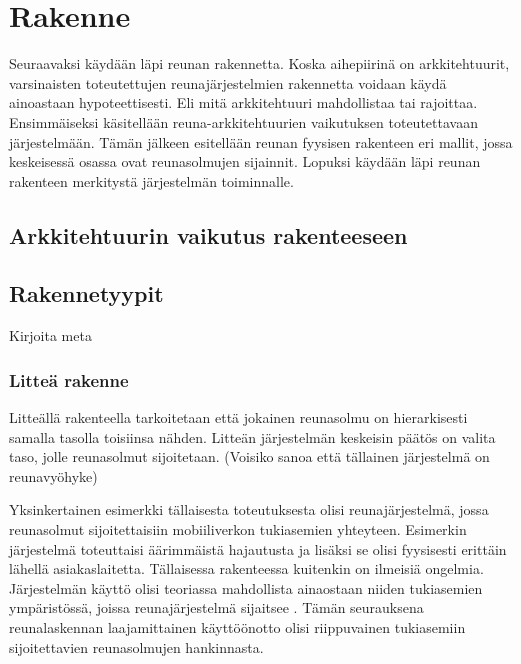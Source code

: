 \section{Rakenne}
Seuraavaksi käydään läpi reunan rakennetta. Koska aihepiirinä on arkkitehtuurit, varsinaisten toteutettujen reunajärjestelmien rakennetta voidaan käydä ainoastaan hypoteettisesti. 
Eli mitä arkkitehtuuri mahdollistaa tai rajoittaa.
Ensimmäiseksi käsitellään reuna-arkkitehtuurien vaikutuksen toteutettavaan järjestelmään.
Tämän jälkeen esitellään reunan fyysisen rakenteen eri mallit, jossa keskeisessä osassa ovat reunasolmujen sijainnit.
Lopuksi käydään läpi reunan rakenteen merkitystä järjestelmän toiminnalle.

\subsection{Arkkitehtuurin vaikutus rakenteeseen}

\subsection{Rakennetyypit}
Kirjoita meta

\subsubsection{Litteä rakenne}
Litteällä rakenteella tarkoitetaan että jokainen reunasolmu on hierarkisesti samalla tasolla toisiinsa nähden. Litteän järjestelmän keskeisin päätös on valita taso, jolle reunasolmut sijoitetaan. (Voisiko sanoa että tällainen järjestelmä on reunavyöhyke)

Yksinkertainen esimerkki tällaisesta toteutuksesta olisi reunajärjestelmä, jossa reunasolmut sijoitettaisiin mobiiliverkon tukiasemien yhteyteen. Esimerkin järjestelmä  toteuttaisi äärimmäistä hajautusta ja lisäksi se olisi fyysisesti erittäin lähellä asiakaslaitetta. Tällaisessa rakenteessa kuitenkin on ilmeisiä ongelmia. Järjestelmän käyttö olisi teoriassa mahdollista ainaostaan niiden tukiasemien ympäristössä, joissa reunajärjestelmä sijaitsee \cite{hassuautokuva}. Tämän seurauksena reunalaskennan laajamittainen käyttöönotto olisi riippuvainen tukiasemiin sijoitettavien reunasolmujen hankinnasta.

